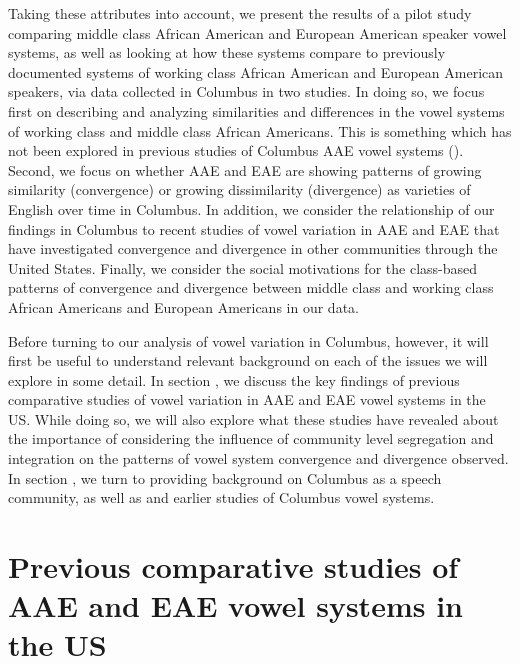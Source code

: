 \documentclass[output=paper,colorlinks,citecolor=brown]{langscibook}
\begin{document}
\begin{sloppypar}
Taking these attributes into account, we present the results of a pilot study comparing middle class African American and European American speaker vowel systems, as well as looking at how these systems compare to previously documented systems of working class African American and European American speakers, via data collected in Columbus in two studies. In doing so, we focus first on describing and analyzing similarities and differences in the vowel systems of working class and middle class African Americans. This is something which has not been explored in previous studies of Columbus AAE vowel systems (\citealt{Durianschumacher2010,Thomas1989vowel}). Second, we focus on whether AAE and EAE are showing patterns of growing similarity (convergence) or growing dissimilarity (divergence) as varieties of English over time in Columbus. In addition, we consider the relationship of our findings in Columbus to recent studies of vowel variation in AAE and EAE that have investigated convergence and divergence in other communities through the United States. Finally, we consider the social motivations for the class-based patterns of convergence and divergence between middle class and working class African Americans and European Americans in our data.
\end{sloppypar}

Before turning to our analysis of vowel variation in Columbus, however, it will first be useful to understand relevant background on each of the issues we will explore in some detail. In section , we discuss the key findings of previous comparative studies of vowel variation in AAE and EAE vowel systems in the US. While doing so, we will also explore what these studies have revealed about the importance of considering the influence of community level segregation and integration on the patterns of vowel system convergence and divergence observed. In section , we turn to providing background on Columbus as a speech community, as well as  and  earlier studies of Columbus vowel systems.

\section{Previous comparative studies of AAE and EAE vowel systems in the US} \label{sec:durian:2}
\end{document}
